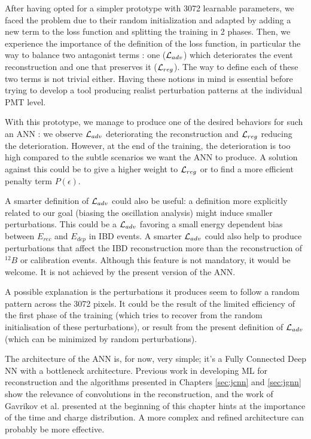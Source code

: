 \documentclass[../main.tex]{subfiles}
\begin{document}
After having opted for a simpler prototype with 3072 learnable parameters, we faced the problem due to their random initialization and adapted by adding a new term to the loss function and splitting the training in 2 phases. Then, we experience the importance of the definition of the loss function, in particular the way to balance two antagonist terms :
one (${\cal L}_{adv}$) which deteriorates the event reconstruction and one that preserves it (${\cal L}_{reg}$). The way to define each of these two terms is not trivial either. Having these notions in mind is essential before trying to develop a tool producing realist perturbation patterns at the individual PMT level.

With this prototype, we manage to produce one of the desired behaviors for such an ANN : we observe ${\cal L}_{adv}$ deteriorating the reconstruction and ${\cal L}_{reg}$ reducing the deterioration. However, at the end of the training, the deterioration is too high compared to the subtle scenarios we want the ANN to produce. A solution against this could be to give a higher weight to ${\cal L}_{reg}$ or to find a more efficient penalty term $P(\epsilon)$.

A smarter definition of ${\cal L}_{adv}$ could also be useful: a definition more explicitly related to our goal (biasing the oscillation analysis) might induce smaller perturbations. This could be a ${\cal L}_{adv}$ favoring a small energy dependent bias between $E_{rec}$ and $E_{dep}$ in IBD events. A smarter ${\cal L}_{adv}$ could also help to produce perturbations that affect the IBD reconstruction more than the reconstruction of $^{12}B$ or calibration events. Although this feature is not mandatory, it would be welcome. It is not achieved by the present version of the ANN.

A possible explanation is the perturbations it produces seem to follow a random pattern across the 3072 pixels. It could be the result of the limited efficiency of the first phase of the training (which tries to recover from the random initialisation of these perturbations), or result from the present definition of ${\cal L}_{adv}$ (which can be minimized by random perturbations).

The architecture of the ANN is, for now, very simple; it's a Fully Connected Deep NN with a bottleneck architecture. Previous work in developing ML for reconstruction \cite{qian_vertex_2021} and the algorithms presented in Chapters \ref{sec:jcnn} and \ref{sec:jgnn} show the relevance of convolutions in the reconstruction, and the work of Gavrikov et al. \cite{gavrikov_energy_2022} presented at the beginning of this chapter hints at the importance of the time and charge distribution. A more complex and refined architecture can probably be more effective.
\end{document}
